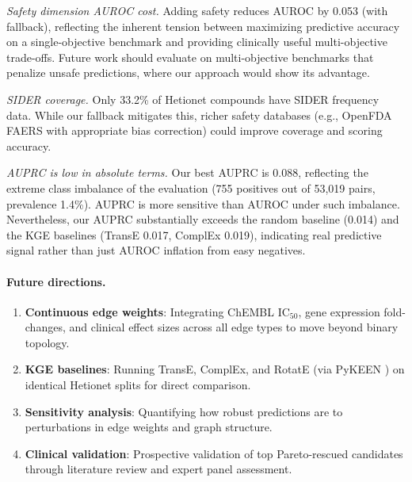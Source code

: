 \documentclass[11pt,a4paper]{article}
\begin{document}
\textit{Safety dimension AUROC cost.}
Adding safety reduces AUROC by 0.053 (with fallback), reflecting the
inherent tension between maximizing predictive accuracy on a
single-objective benchmark and providing clinically useful
multi-objective trade-offs. Future work should evaluate on
multi-objective benchmarks that penalize unsafe predictions, where
our approach would show its advantage.

\textit{SIDER coverage.}
Only 33.2\% of Hetionet compounds have SIDER frequency data. While our
fallback mitigates this, richer safety databases (e.g., OpenFDA FAERS
with appropriate bias correction) could improve coverage and scoring
accuracy.

\textit{AUPRC is low in absolute terms.}
Our best AUPRC is 0.088, reflecting the extreme class imbalance of the
evaluation (755 positives out of 53{,}019 pairs, prevalence 1.4\%).
AUPRC is more sensitive than AUROC under such imbalance. Nevertheless,
our AUPRC substantially exceeds the random baseline (0.014) and the KGE
baselines (TransE 0.017, ComplEx 0.019), indicating real predictive
signal rather than just AUROC inflation from easy negatives.

\paragraph{Future directions.}

\begin{enumerate}
    \item \textbf{Continuous edge weights}: Integrating ChEMBL IC$_{50}$,
    gene expression fold-changes, and clinical effect sizes across all
    edge types to move beyond binary topology.

    \item \textbf{KGE baselines}: Running TransE, ComplEx, and RotatE
    (via PyKEEN \citep{ali2021pykeen}) on identical Hetionet splits for
    direct comparison.

    \item \textbf{Sensitivity analysis}: Quantifying how robust
    predictions are to perturbations in edge weights and graph structure.

    \item \textbf{Clinical validation}: Prospective validation of
    top Pareto-rescued candidates through literature review and
    expert panel assessment.
\end{enumerate}

\end{document}
